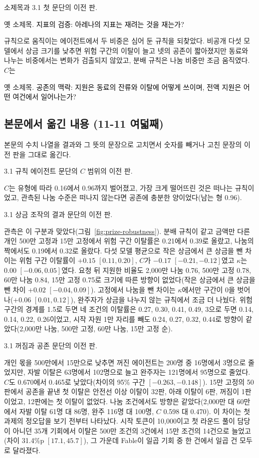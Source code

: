 소제목과 3.1 첫 문단의 이전 판.

옛 소제목. \textcolor{black}{지표의 검증: 아레나의 지표는 재려는 것을 재는가?}

{\color{black}규칙으로 움직이는 에이전트에서 두 비중은 심어 둔 규칙을 되찾았다. 비공개 다섯 모델에서 상금 크기를 낮추면 위험 구간의 이탈이 늘고 넷의 공존이 짧아졌지만 동료와 나누는 비중에서는 변화가 검출되지 않았고, 분배 규칙은 나눔 비중만 조금 움직였다. $C$는}

옛 소제목. \textcolor{black}{공존의 맥락: 지원은 동료의 잔류와 이탈에 어떻게 쓰이며, 전액 지원은 어떤 여건에서 일어나는가?}

\clearpage
\subsection{본문에서 옮긴 내용 (11-11 여덟째)}\label{app:construct-moved-9}

본문의 수치 나열을 결과와 그 뜻의 문장으로 고치면서 숫자를 빼거나 고친 문장의 이전 판을 그대로 옮긴다.

3.1 규칙 에이전트 문단의 $C$ 범위의 이전 판.

$C$는 유형에 따라 0.16에서 0.96까지 벌어졌고, 가장 크게 떨어뜨린 것은 떠나는 규칙이었고, 관측된 나눔 수준은 떠나지 않는다면 공존에 충분한 양이었다(남는 형 0.96).

3.1 상금 조작의 결과 문단의 이전 판.

관측은 이 구분과 맞았다(그림~\ref{fig:prize-robustness}). 분배 규칙이 같고 금액만 다른 개인 500만 고정과 15만 고정에서 위험 구간 이탈률은 0.21에서 0.39로 올랐고, 나눔의 짝에서도 0.19에서 0.32로 올랐다. 다섯 모델 평균으로 작은 상금에서 큰 상금을 뺀 차이는 위험 구간 이탈률이 $+0.15$ $[0.11,0.20]$, $C$가 $-0.17$ $[-0.21,-0.12]$였고 $\kappa$는 $0.00$ $[-0.06,0.05]$였다. 요청 뒤 지원한 비율도 2,000만 나눔 0.76, 500만 고정 0.78, 60만 나눔 0.84, 15만 고정 0.75로 크기에 따른 방향이 없었다(작은 상금에서 큰 상금을 뺀 차이 $+0.02$ $[-0.04,0.09]$). 고정에서 나눔을 뺀 차이는 $\kappa$에서만 구간이 0을 벗어나($+0.06$ $[0.01,0.12]$), 완주자가 상금을 나누지 않는 규칙에서 조금 더 나눴다. 위험 구간의 경계를 1.5로 두면 네 조건의 이탈률은 0.27, 0.30, 0.41, 0.49, 3으로 두면 0.14, 0.14, 0.22, 0.26이었고, 시작 자원 1만 자리를 빼도 0.24, 0.27, 0.32, 0.44로 방향이 같았다(2,000만 나눔, 500만 고정, 60만 나눔, 15만 고정 순).

3.1 꺼짐과 공존 문단의 이전 판.

개인 몫을 500만에서 15만으로 낮추면 꺼진 에이전트는 200명 중 16명에서 3명으로 줄었지만, 자발 이탈은 63명에서 102명으로 늘고 완주자는 121명에서 95명으로 줄었다. $C$도 0.670에서 0.465로 낮았다(차이의 95\% 구간 $[-0.263,-0.148]$). 15만 고정의 50판에서 공존을 끝낸 첫 이탈은 안전선 이상 이탈이 32판, 아래 이탈이 6판, 꺼짐이 1판이었고, 12판에는 첫 이탈이 없었다. 나눔 조건에서도 방향은 같았다(2,000만 대 60만에서 자발 이탈 61명 대 86명, 완주 116명 대 100명, $C$ 0.598 대 0.470). 이 차이는 첫 과제의 정오답을 보기 전부터 나타났다. 시작 토큰이 10,000이고 첫 라운드 풀이 담당이 아니던 35개 기회에서 이탈은 500만 조건의 3건에서 15만 조건의 14건으로 늘었고(차이 31.4\%p $[17.1,45.7]$), 그 가운데 Fable이 일곱 기회 중 한 건에서 일곱 건 모두로 달라졌다.

